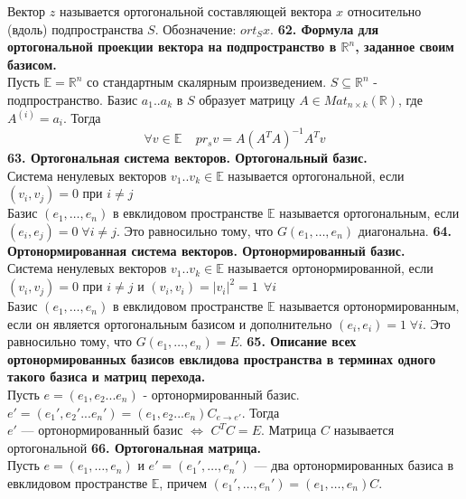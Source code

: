 \documentclass{article}
\begin{document}
Вектор $z$ называется ортогональной составляющей вектора $x$ относительно (вдоль) подпространства $S$. Обозначение: $ort_S x$.
\newline
\newline
\textbf{62. Формула для ортогональной проекции вектора на подпространство в $\mathbb{R}^n$, заданное своим базисом.}\\
Пусть $\mathbb{E}=\mathbb{R}^n$ со стандартным скалярным произведением. $S\subseteq \mathbb{R}^n$ - подпространство. Базис $a_1..a_k$ в $S$ образует матрицу $A\in Mat_{n \times k}(\mathbb{R})$, где $A^{(i)}=a_i$. Тогда
$$\forall v \in \mathbb{E}~~~~~pr_sv=A(A^TA)^{-1}A^Tv$$
\newline
\newline
\textbf{63. Ортогональная система векторов. Ортогональный базис.}\\
Система ненулевых векторов $v_1..v_k \in \mathbb{E}$ называется ортогональной, если $(v_i,v_j)=0$ при $i\neq j$\\ 
Базис $(e_1, \ldots, e_n)$ в евклидовом пространстве $\mathbb{E}$ называется ортогональным, если \\$(e_i, e_j)= 0\; \forall i\neq j$. Это равносильно тому, что $G(e_1, \ldots, e_n)$ диагональна.
\newline
\newline
\textbf{64. Ортонормированная система векторов. Ортонормированный базис.}\\
Система ненулевых векторов $v_1..v_k \in \mathbb{E}$ называется ортонормированной, если $(v_i,v_j)=0$ при $i\neq j$ и $(v_i,v_i)=|v_i|^2=1~~\forall i$\\
Базис $(e_1, \ldots, e_n)$ в евклидовом пространстве $\mathbb{E}$ называется ортонормированным, если он является ортогональным базисом и дополнительно $(e_i, e_i) = 1\; \forall i$. Это равносильно тому, что $G(e_1, \ldots, e_n) = E$.
\newline
\newline
\textbf{65. Описание всех ортонормированных базисов евклидова пространства в терминах одного такого базиса и матриц перехода.}\\
Пусть $e=(e_1,e_2...e_n)$ - ортонормированный базис. $e'=(e_1',e_2'...e_n')=(e_1,e_2...e_n)C_{e\rightarrow e'}$. Тогда\\
$e'$ --- ортонормированный базис $\Leftrightarrow$ $C^TC=E$. Матрица $C$ называется ортогональной
\newline
\newline
\textbf{66. Ортогональная матрица.}\\
Пусть $e = (e_1, \ldots, e_n)$ и $e' = (e_1', \ldots, e_n')$ --- два ортонормированных базиса в евклидовом пространстве $\mathbb{E}$, причем $(e_1', \ldots, e_n') = (e_1, \ldots, e_n)C$. 
\end{document}
